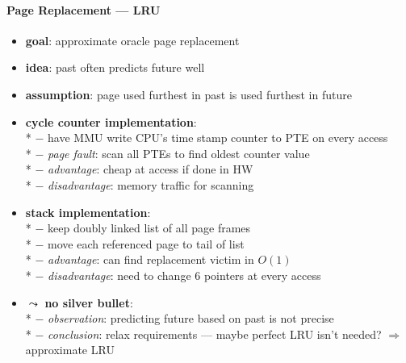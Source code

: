 \paragraph{Page Replacement --- LRU}
\begin{itemize}
  \item \textbf{goal}: approximate oracle page replacement
  \item \textbf{idea}: past often predicts future well
  \item \textbf{assumption}: page used furthest in past is used furthest in future
  \item \textbf{cycle counter implementation}: \\*
    $ - $ have MMU write CPU's time stamp counter to PTE on every access \\*
    $ - $ \emph{page fault}: scan all PTEs to find oldest counter value \\*
    $ - $ \emph{advantage}: cheap at access if done in HW \\*
    $ - $ \emph{disadvantage}: memory traffic for scanning
  \item \textbf{stack implementation}: \\*
    $ - $ keep doubly linked list of all page frames \\*
    $ - $ move each referenced page to tail of list \\*
    $ - $ \emph{advantage}: can find replacement victim in $ O(1) $ \\*
    $ - $ \emph{disadvantage}: need to change 6 pointers at every access
  \item $ \leadsto $ \textbf{no silver bullet}: \\*
    $ - $ \emph{observation}: predicting future based on past is not precise \\*
    $ - $ \emph{conclusion}: relax requirements --- maybe perfect LRU isn't needed? $ \Rightarrow $ approximate LRU
\end{itemize}

